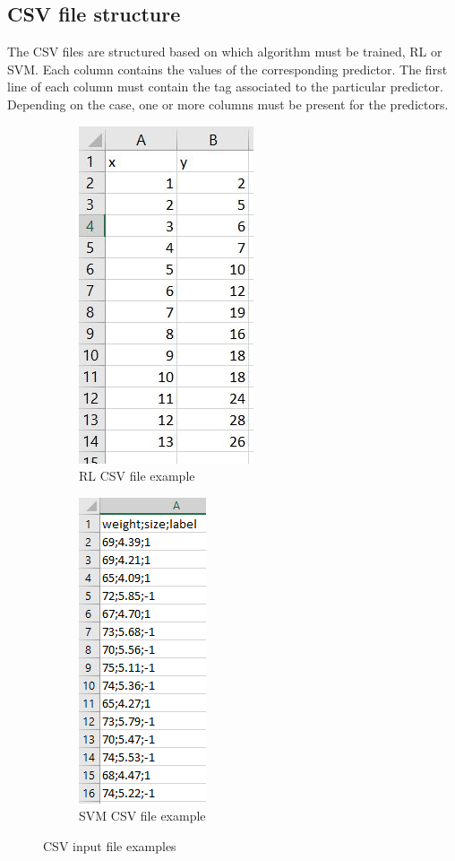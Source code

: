 \subsection{CSV file structure}
The CSV files are structured based on which algorithm must be trained, RL or SVM.
Each column contains the values of the corresponding predictor\glo. The first line  of each column must contain the tag associated to the particular predictor. Depending on the case, one or more columns must be present for the predictors.

\begin{figure}[H]
\centering
\begin{subfigure}{.5\textwidth}
\centering
\includegraphics[scale=1]{img/json/csvfileRL.png}
\caption{RL CSV file example}
\end{subfigure}%
\begin{subfigure}{.5\textwidth}
\centering
\includegraphics[scale=1]{img/json/csvfileSVM.png}
\caption{SVM CSV file example}
\end{subfigure}
\caption{CSV input file examples}
\end{figure}
\clearpage 